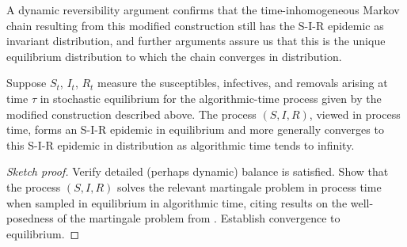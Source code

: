 \documentclass[]{article}
\newcommand{\SIR}{S-I-R\xspace}
\begin{document}
A dynamic reversibility argument confirms that the time-inhomogeneous Markov chain resulting from this modified construction still has the \SIR epidemic as invariant distribution,
and further arguments assure us that this is the unique equilibrium distribution to which the chain converges in distribution.%
 \begin{thm}\label{thm:SIR-epidemic-2}
 Suppose \({S}_t\), \({I}_t\), \({R}_t\) measure the susceptibles, infectives, and removals 
 arising at time \(\tau\) in stochastic equilibrium for the algorithmic-time process given by the modified construction described above.
 The process \(({S}, {I}, {R})\), viewed in process time, forms an \SIR epidemic in equilibrium
 and more generally converges to this \SIR epidemic in distribution as algorithmic time tends to infinity.
\end{thm}
\begin{proof}[Sketch proof]
 Verify detailed (perhaps dynamic) balance is satisfied.
 Show that the process \(({S}, {I}, {R})\) solves the relevant martingale problem in process time when sampled in equilibrium in algorithmic time,  
 citing results on the well-posedness of the martingale problem from \citet{StroockVaradhan-1979}.%
 Establish convergence to equilibrium.
\end{proof}


\end{document}
